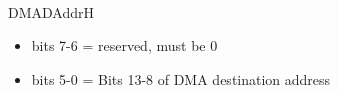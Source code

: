 \\
DMADAddrH
\begin{itemize}
\item bits 7-6 = reserved, must be 0
\item bits 5-0 = Bits 13-8 of DMA destination address
\end{itemize}

